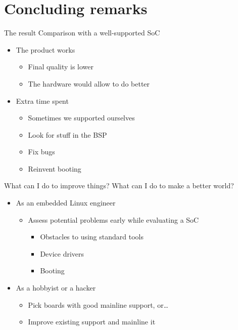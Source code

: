 \documentclass[xetex,table]{beamer}
\begin{document}
\section{Concluding remarks}

\begin{frame}{The result}
  Comparison with a well-supported SoC
  \begin{itemize}
  \item The product works
    \begin{itemize}
    \item Final quality is lower
    \item The hardware would allow to do better
    \end{itemize}
  \item Extra time spent
    \begin{itemize}
    \item Sometimes we supported ourselves
    \item Look for stuff in the BSP
    \item Fix bugs
    \item Reinvent booting
    \end{itemize}
  \end{itemize}
\end{frame}

\begin{frame}{What can I do to improve things?}
  What can I do to make a better world?
  \begin{itemize}
  \item As an embedded Linux engineer
    \begin{itemize}
    \item Assess potential problems early while evaluating a SoC
      \begin{itemize}
      \item Obstacles to using standard tools
      \item Device drivers
      \item Booting
      \end{itemize}
    \end{itemize}
  \item As a hobbyist or a hacker
    \begin{itemize}
    \item Pick boards with good mainline support, or\dots
    \item Improve existing support and mainline it
    \end{itemize}
  \end{itemize}
\end{frame}
\end{document}
